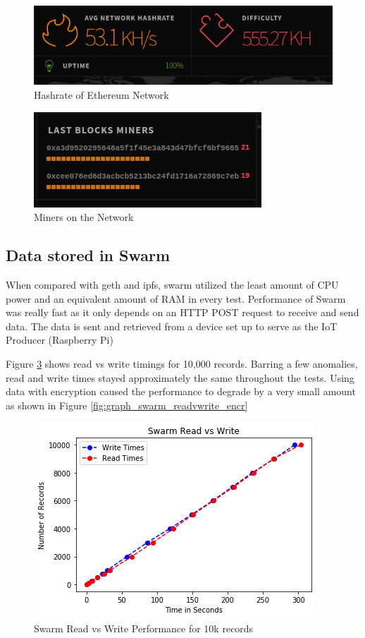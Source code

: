 \documentclass[11pt,openright]{report}
\begin{document}
\begin{figure}
    \centering
    \includegraphics[scale=1]{results/hashrate.png}
    \caption{Hashrate of Ethereum Network}
    \label{fig:eth_hashrate}
\end{figure}


\begin{figure}
    \centering
    \includegraphics[scale=1]{results/miners.png}
    \caption{Miners on the Network}
    \label{fig:eth_miners}
\end{figure}


\subsection{Data stored in Swarm}
When compared with geth and ipfs, swarm utilized the least amount of CPU power and an equivalent amount of RAM in every test. Performance of Swarm was really fast as it only depends on an HTTP POST request to receive and send data. The data is sent and retrieved from a device set up to serve as the IoT Producer (Raspberry Pi)

Figure \ref{fig:graph_swarm_readvwrite} shows read vs write timings for 10,000 records. Barring a few anomalies, read and write times stayed approximately the same throughout the tests. Using data with encryption caused the performance to degrade by a very small amount as shown in Figure \ref{fig:graph_swarm_readvwrite_encr}

\begin{figure}
    \centering
    \includegraphics[scale=1]{results/graphs/Swarm_Read_v_Write.png}
    \caption{Swarm Read vs Write Performance for 10k records}
    \label{fig:graph_swarm_readvwrite}
\end{figure}
\end{document}
